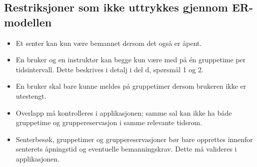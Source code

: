 \subsection*{Restriksjoner som ikke uttrykkes gjennom ER-modellen}
\begin{itemize}
    \item Et senter kan kun være bemannet dersom det også er åpent.
    \item En bruker og en instruktør kan begge kun være med på én gruppetime per tidsintervall. Dette beskrives i detalj i del d, spørsmål 1 og 2.
    \item En bruker skal bare kunne meldes på gruppetimer dersom brukeren ikke er utestengt.
    \item Overlapp må kontrolleres i applikasjonen; samme sal kan ikke ha både gruppetime og gruppereservasjon i samme relevante tidsrom.
    \item Senterbesøk, gruppetimer og gruppereservasjoner bør bare opprettes innenfor senterets åpningstid og eventuelle bemanningskrav. Dette må valideres i applikasjonen.
\end{itemize}

